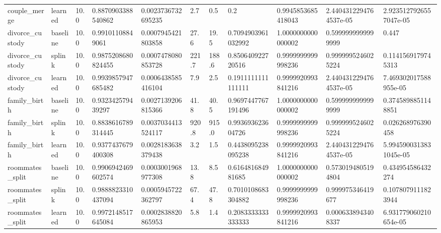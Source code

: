 \begin{longtable}{lllllllllll}
couple\_merge & learned & 10.0 & 0.8870903388540862 & 0.0023736732695235 & 2.7 & 0.5 & 0.2 & 0.9945853685418043 & 2.4404312294764537e-05 & 2.9235127926557047e-05 \\
divorce\_custody & baseline & 10.0 & 0.99101108849061 & 0.0007945421803858 & 27.6 & 19.5 & 0.7094903961032992 & 1.0000000000000002 & 0.5999999999999999 & 0.447 \\
divorce\_custody & splink & 10.0 & 0.9875208680824455 & 0.0007478080853728 & 221.7 & 188.6 & 0.850640922720516 & 0.9999999999998236 & 0.9999995246025224 & 0.1141569179745313 \\
divorce\_custody & learned & 10.0 & 0.9939857947685482 & 0.0006438585416104 & 7.9 & 2.5 & 0.1911111111111111 & 0.9999920993841216 & 2.4404312294764537e-05 & 7.469302017588955e-05 \\
family\_birth & baseline & 10.0 & 0.932342579439297 & 0.0027139206815366 & 41.8 & 40.5 & 0.9697447767191496 & 1.0000000000000002 & 0.5999999999999999 & 0.3745898851148851 \\
family\_birth & splink & 10.0 & 0.8838616789314445 & 0.0037034413524117 & 920.8 & 915.0 & 0.993693623604726 & 0.9999999999998236 & 0.9999995246025224 & 0.026268976390458 \\
family\_birth & learned & 10.0 & 0.9377437679400308 & 0.0028183638379438 & 3.2 & 1.5 & 0.4438095238095238 & 0.9999920993841216 & 2.4404312294764537e-05 & 5.9945900313831045e-05 \\
roommates\_split & baseline & 10.0 & 0.9906942469602574 & 0.0003001968977308 & 13.8 & 8.5 & 0.616481684981685 & 1.0000000000000002 & 0.5730194805194804 & 0.434954586432274 \\
roommates\_split & splink & 10.0 & 0.9888823310437094 & 0.0005945722362797 & 67.4 & 47.8 & 0.7010108683304882 & 0.9999999999998236 & 0.999975346419677 & 0.1078079111823944 \\
roommates\_split & learned & 10.0 & 0.9972148517645084 & 0.0002838820865953 & 5.8 & 1.4 & 0.2083333333333333 & 0.9999920993841216 & 0.0006338943408337 & 6.931779060210654e-05 \\
\bottomrule
\end{longtable}
